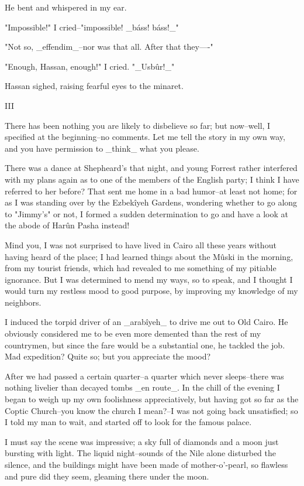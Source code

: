 He bent and whispered in my ear.

"Impossible!" I cried--"impossible! _báss! báss!_"

"Not so, _effendim_--nor was that all. After that they----"

"Enough, Hassan, enough!" I cried. "_Usbûr!_"

Hassan sighed, raising fearful eyes to the minaret.


III

There has been nothing you are likely to disbelieve so far; but
now--well, I specified at the beginning--no comments. Let me tell the
story in my own way, and you have permission to _think_ what you
please.

There was a dance at Shepheard's that night, and young Forrest rather
interfered with my plans again as to one of the members of the English
party; I think I have referred to her before? That sent me home in a
bad humor--at least not home; for as I was standing over by the
Ezbekîyeh Gardens, wondering whether to go along to "Jimmy's" or not,
I formed a sudden determination to go and have a look at the abode of
Harûn Pasha instead!

Mind you, I was not surprised to have lived in Cairo all these years
without having heard of the place; I had learned things about the
Mûski in the morning, from my tourist friends, which had revealed to
me something of my pitiable ignorance. But I was determined to mend my
ways, so to speak, and I thought I would turn my restless mood to good
purpose, by improving my knowledge of my neighbors.

I induced the torpid driver of an _arabîyeh_ to drive me out to Old
Cairo. He obviously considered me to be even more demented than the
rest of my countrymen, but since the fare would be a substantial one,
he tackled the job. Mad expedition? Quite so; but you appreciate the
mood?

After we had passed a certain quarter--a quarter which never
sleeps--there was nothing livelier than decayed tombs _en route_. In
the chill of the evening I began to weigh up my own foolishness
appreciatively, but having got so far as the Coptic Church--you know
the church I mean?--I was not going back unsatisfied; so I told my man
to wait, and started off to look for the famous palace.

I must say the scene was impressive; a sky full of diamonds and a moon
just bursting with light. The liquid night--sounds of the Nile alone
disturbed the silence, and the buildings might have been made of
mother-o'-pearl, so flawless and pure did they seem, gleaming there
under the moon.

